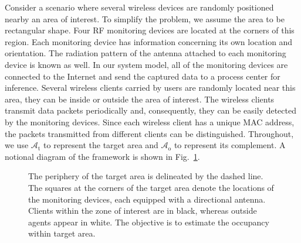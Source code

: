 Consider a scenario where several wireless devices are randomly positioned nearby an area of interest.
To simplify the problem, we assume the area to be rectangular shape.
Four RF monitoring devices are located at the corners of this region.
Each monitoring device has information concerning its own location and orientation.
The radiation pattern of the antenna attached to each monitoring device is known as well.
In our system model, all of the monitoring devices are connected to the Internet and send the captured data to a process center for inference.
Several wireless clients carried by users are randomly located near this area, they can be inside or outside the area of interest.
The wireless clients transmit data packets periodically and, consequently, they can be easily detected by the monitoring devices.
Since each wireless client has a unique MAC address, the packets transmitted from different clients can be distinguished.
Throughout, we use $\mathcal{A}_{\mathrm{t}}$ to represent the target area and $\mathcal{A}_{\mathrm{o}}$ to represent its complement.
A notional diagram of the framework is shown in Fig.~\ref{figure:NotionalDiagram}.
\begin{figure}[t]
\centerline{}
\caption{The periphery of the target area is delineated by the dashed line. 
The squares at the corners of the target area denote the locations of the monitoring devices, each equipped with a directional antenna.
Clients within the zone of interest are in black, whereas outside agents appear in white.
The objective is to estimate the occupancy within target area.}
\label{figure:NotionalDiagram}
\end{figure}

